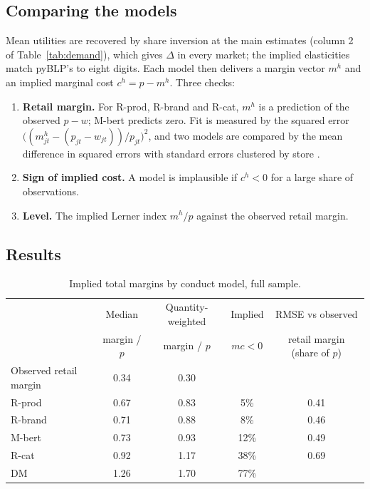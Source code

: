 \documentclass[11pt]{article}
\newcommand{\model}[1]{\textsf{#1}}
\begin{document}
\subsection{Comparing the models}

Mean utilities are recovered by share inversion at the main estimates (column 2 of
Table~\ref{tab:demand}), which gives $\Delta$ in every market; the implied elasticities match
pyBLP's to eight digits. Each model then delivers a margin vector $m^h$ and an implied
marginal cost $c^h = p - m^h$. Three checks:
\begin{enumerate}
  \item \textbf{Retail margin.} For \model{R-prod}, \model{R-brand} and \model{R-cat}, $m^h$
        is a prediction of the observed $p - w$; \model{M-bert} predicts zero. Fit is
        measured by the squared error
        $\bigl((m^h_{jt} - (p_{jt} - w_{jt})) / p_{jt}\bigr)^2$, and two models are compared
        by the mean difference in squared errors with standard errors clustered by store
        \citep[in the spirit of][]{riversvuong2002}.
  \item \textbf{Sign of implied cost.} A model is implausible if $c^h < 0$ for a large share
        of observations.
  \item \textbf{Level.} The implied Lerner index $m^h / p$ against the observed retail
        margin.
\end{enumerate}

\subsection{Results}

\begin{table}[h!]
\centering\small
\begin{tabular}{@{}lcccc@{}}
\toprule
 & Median & Quantity-weighted & Implied & RMSE vs observed \\
 & margin / $p$ & margin / $p$ & $mc < 0$ & retail margin (share of $p$) \\
\midrule
Observed retail margin & 0.34 & 0.30 &       &      \\
\model{R-prod}         & 0.67 & 0.83 & 5\%   & 0.41 \\
\model{R-brand}        & 0.71 & 0.88 & 8\%   & 0.46 \\
\model{M-bert}         & 0.73 & 0.93 & 12\%  & 0.49 \\
\model{R-cat}          & 0.92 & 1.17 & 38\%  & 0.69 \\
\model{DM}             & 1.26 & 1.70 & 77\%  &      \\
\bottomrule
\end{tabular}
\caption{Implied total margins by conduct model, full sample.}\label{tab:margins}
\end{table}
\end{document}
